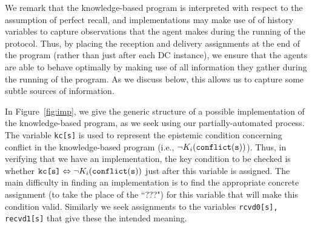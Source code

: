 \documentclass[]{llncs}
\newcommand{\dimp}{\Leftrightarrow}
\newcommand{\conflict}{\tt conflict}
\begin{document}
We remark that the knowledge-based program  is interpreted with respect to 
the assumption of perfect recall, and implementations may make use of of history variables 
to capture observations that the agent makes during the running of the protocol. 
Thus, by placing the reception and delivery assignments at the end of the program (rather than just after each DC instance), 
we ensure that the agents are able to behave optimally by making use of all information they gather during the running of the program. 
As we discuss below, this allows us to capture some subtle sources of information. 

In Figure~\ref{fig:imp}, we give the generic structure of a possible implementation of the 
knowledge-based program, as we seek using our partially-automated process. 
The variable \verb+kc[s]+ is used to represent the epistemic condition
concerning conflict  in the knowledge-based program (i.e., $\neg K _{i}(\conflict(s))$). 
Thus, in verifying that we have an implementation, the 
key condition to be checked is whether $\verb+kc[s]+\dimp \neg K _{i}(\conflict(s))$ 
just after this variable is  assigned. 
The main difficulty in finding an implementation is to find the appropriate  concrete 
assignment (to take the place of the ``???") for this variable that will make this condition valid. 
Similarly we seek assignments to the variables \verb+rcvd0[s], recvd1[s]+ that give these the intended meaning. 
\end{document}
